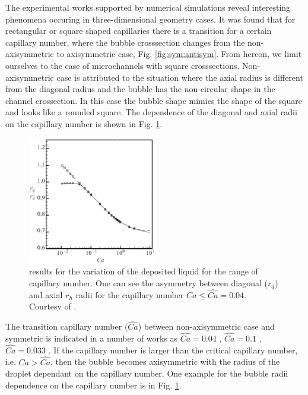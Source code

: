 \documentclass{CFD2011}
\begin{document}
\begin{description}
The experimental works supported by numerical simulations reveal interesting phenomena occuring in
three-dimensional geometry cases. It was found \cite{heil-threedim,wong-films} that for rectangular
or square shaped capillaries there is a transition for a
certain capillary number, where the bubble crosssection changes from the non-axisymmetric to
axisymmetric case,
Fig. \ref{fig:sym:antisym}.
From hereon, we limit ourselves to the case of microchannels with square crosssections.
Non-axisymmetric case is attributed to the situation where the axial radius is different from the
diagonal radius and the bubble has the non-circular shape in the channel crossection. In this case
the bubble shape mimics the shape of the square and looks like a rounded square. The dependence
of the diagonal and axial radii on the capillary number is shown in Fig. 
\ref{fig:heil:three:dim}.
\begin{figure}[ht]
\includegraphics[width=0.5\textwidth]{Figures/capillary_width_heil.eps}
\caption{\citet{heil-threedim} results for the variation of the deposited liquid for the range of
capillary number. One can see the asymmetry between diagonal ($r_d$) and axial $r_h$ radii for the
capillary
number $Ca\leq\hat{Ca}=0.04$. Courtesy of \citet{heil-threedim}. \label{fig:heil:three:dim}}
\end{figure}
The transition capillary number ($\widehat{Ca}$) between non-axisymmetric case and symmetric is
indicated in a number of
works as $\widehat{Ca}=0.04$ \cite{cerro-bubble-train},
$\widehat{Ca}=0.1$
\cite{cerro-space}, $\widehat{Ca}=0.033$ \cite{heil-threedim}. If the capillary number is larger
than
the critical capillary number, i.e. $Ca>\widehat{Ca}$, then the bubble becomes axisymmetric with the
radius of the droplet dependant on the capillary number. One example for the bubble radii
dependence on the capillary number is in Fig. \ref{fig:heil:three:dim}.


\end{description}
\end{document}
